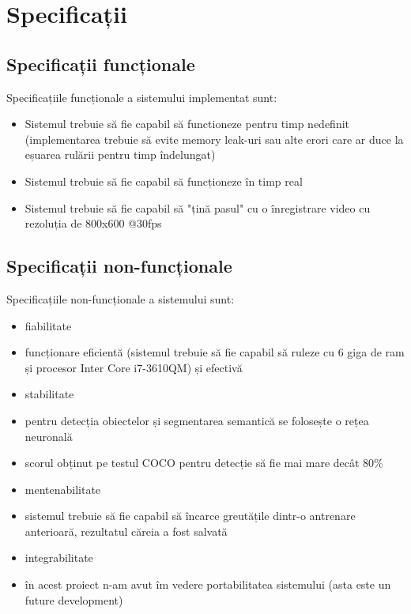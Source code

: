 \section{Specificații}
\subsection{Specificații funcționale}
Specificațiile funcționale a sistemului implementat sunt:
\begin{itemize}
	\item Sistemul trebuie să fie capabil să functioneze pentru timp nedefinit (implementarea trebuie să evite memory leak-uri sau alte erori care ar duce la eșuarea rulării pentru timp îndelungat)
	\item Sistemul trebuie să fie capabil să funcționeze în timp real
	\item Sistemul trebuie să fie capabil să "țină pasul" cu o înregistrare video cu rezoluția de 800x600 @30fps
\end{itemize}
\subsection{Specificații non-funcționale}
Specificațiile non-funcționale a sistemului sunt:
\begin{itemize}
	\item fiabilitate
	\item funcționare eficientă (sistemul trebuie să fie capabil să ruleze cu 6 giga de ram și procesor Inter Core i7-3610QM) și efectivă
	\item stabilitate
	\item pentru detecția obiectelor și segmentarea semantică se folosește o rețea neuronală
	\item scorul obținut pe testul COCO pentru detecție să fie mai mare decât  80\%
	\item mentenabilitate
	\item sistemul trebuie să fie capabil să încarce greutățile dintr-o antrenare anterioară, rezultatul căreia a fost salvată
	\item integrabilitate
	\item în acest proiect n-am avut îm vedere portabilitatea sistemului (asta este un future development)
\end{itemize}


